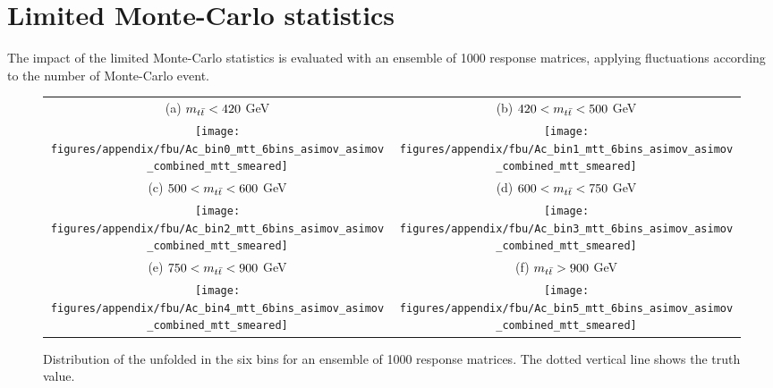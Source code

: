 \section{Limited Monte-Carlo statistics}
\label{app:unfolding:mcstat}

The impact of the limited Monte-Carlo statistics is evaluated with an
ensemble of 1000 response matrices, applying fluctuations according
to the number of Monte-Carlo event.

\begin{figure}[htbp]
\begin{center}
\begin{tabular}{cc}                                    
{(a)  $m_{t\bar{t}}{} < 420$ GeV} & {(b) $420 < m_{t\bar{t}}{} < 500$ GeV}  \\
 \texttt{[image: figures/appendix/fbu/Ac\_bin0\_mtt\_6bins\_asimov\_asimov\_combined\_mtt\_smeared]} &
 \texttt{[image: figures/appendix/fbu/Ac\_bin1\_mtt\_6bins\_asimov\_asimov\_combined\_mtt\_smeared]} \\
{(c) $500 < m_{t\bar{t}}{} < 600$ GeV} & {(d) $600 < m_{t\bar{t}}{} < 750$ GeV}  \\
 \texttt{[image: figures/appendix/fbu/Ac\_bin2\_mtt\_6bins\_asimov\_asimov\_combined\_mtt\_smeared]} &
 \texttt{[image: figures/appendix/fbu/Ac\_bin3\_mtt\_6bins\_asimov\_asimov\_combined\_mtt\_smeared]} \\
{(e) $750 < m_{t\bar{t}}{} < 900$ GeV} & {(f) $m_{t\bar{t}}{} > 900$ GeV}  \\
 \texttt{[image: figures/appendix/fbu/Ac\_bin4\_mtt\_6bins\_asimov\_asimov\_combined\_mtt\_smeared]} &
 \texttt{[image: figures/appendix/fbu/Ac\_bin5\_mtt\_6bins\_asimov\_asimov\_combined\_mtt\_smeared]} \\
\end{tabular}\caption{Distribution of the unfolded \ac{} in the six
  \mtt{} bins for an ensemble of 1000 response matrices. The dotted
  vertical line shows the truth \ac{} value.}
\label{fig:app:unf:limstatmtt}
\end{center}
\end{figure}
